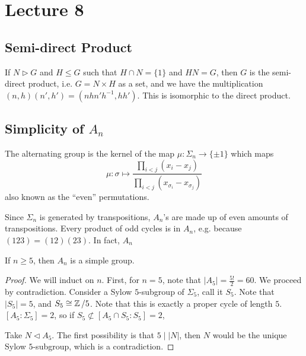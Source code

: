 \section{Lecture 8}
\subsection{Semi-direct Product}
\begin{theorem}
    If $N \triangleright G$ and $H \le G$ such that $H \cap N = \{1\}$ and $HN = G$,
    then $G$ is the semi-direct product, i.e. $G = N \times H$ as a set,
    and we have the multiplication $(n, h)(n', h') = (n h n' h^{-1}, h h')$. This is isomorphic to the direct product.
\end{theorem}

\subsection{Simplicity of $A_n$}
\begin{definition}
    The alternating group is the kernel of the map $\mu: \Sigma_n \to \{\pm 1\}$
    which maps
    \[ \mu: \sigma \mapsto \frac{\prod_{i < j} (x_i - x_j)}{\prod_{i < j} (x_{\sigma_i} - x_{\sigma_j})} \]
    also known as the ``even'' permutations.
\end{definition}
Since $\Sigma_n$ is generated by transpositions, $A_n$'s are made up of
even amounts of transpositions. Every product of odd cycles is in $A_n$, e.g. because $(1 2 3) = (1 2)(2 3)$.
In fact, $A_n$ 
\begin{theorem}
    If $n \ge 5$, then $A_n$ is a simple group.
    \begin{proof}
        We will induct on $n$. First, for $n = 5$, note that $|A_5| = \frac{5!}{2} = 60$. 
        We proceed by contradiction. Consider a Sylow $5$-subgroup of $\Sigma_5$, call it $S_5$.
        Note that $|S_5| = 5$, and $S_5 \cong \operatorname{\mathbb{Z}}/5$.
        Note that this is exactly a proper cycle of length $5$. $[A_5 : \Sigma_5] = 2$, so
        if $S_5 \not\subset [A_5 \cap S_5 : S_5] = 2$,

        
        Take $N \triangleleft A_5$.
        The first possibility is that $5 \mid |N|$, then $N$ would be the unique Sylow $5$-subgroup, which is a contradiction.
    \end{proof}
\end{theorem}

